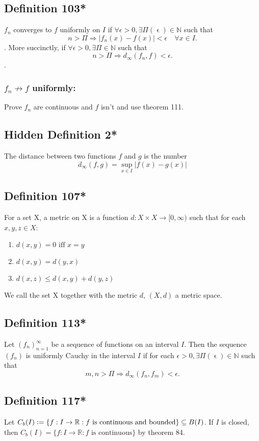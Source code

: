 \documentclass{article}
\DeclareMathOperator\eps{\epsilon}
\begin{document}
\subsection{Definition 103*}
$f_n$ converges to $f$ uniformly on $I$ if $\forall \epsilon > 0, \exists \Pi(\eps) \in \mathbb{N}$ such that \[
n> \Pi \Longrightarrow |f_n(x)-f(x)|<\epsilon \quad \forall x \in I.
\]. More succinctly,
if $\forall \epsilon > 0, \exists \Pi \in \mathbb{N}$ such that \[
n> \Pi \Longrightarrow d_{\infty}(f_n,f)<\epsilon.
\].
\subsubsection*{$f_n \not \to f$ uniformly:}
Prove $f_n$ are continuous and $f$ isn't and use theorem 111.
\subsection{Hidden Definition 2*}
The distance between two functions $f$ and $g$ is the number $$d_\infty(f,g) = \sup_{x \in I}|f(x)-g(x)|$$
\subsection{Definition 107*}
For a set X, a metric on X is a function $d: X \times X \to [0, \infty)$
such that for each $x,y,z \in X$:
\begin{enumerate}
\item $d(x,y) = 0 \text{ iff } x=y$
\item $d(x,y) = d(y, x)$
\item $d(x,z) \leq d(x, y) + d(y, z)$
\end{enumerate}
We call the set X together with the metric $d$, $(X, d)$ a metric space.
\subsection{Definition 113*}
Let $(f_n)_{n=1}^{\infty}$ be a sequence of functions on an interval $I$.
Then the sequence $(f_n)$ is uniformly Cauchy in the interval $I$ if
for each $\epsilon > 0, \exists \Pi(\eps) \in \mathbb{N}$ such that \[
m,n > \Pi \Longrightarrow d_{\infty}(f_n, f_m)<\epsilon.
\]
\subsection{Definition 117*}
Let $C_b(I) \vcentcolon=\{ f:I \to \mathbb{R}:f \text{ is continuous and bounded} \} \subseteq B(I)$.
If $I$ is closed, then $C_b(I) = \{ f:I \to \mathbb{R}:f \text{ is continuous} \}$ by theorem 84.
\end{document}
